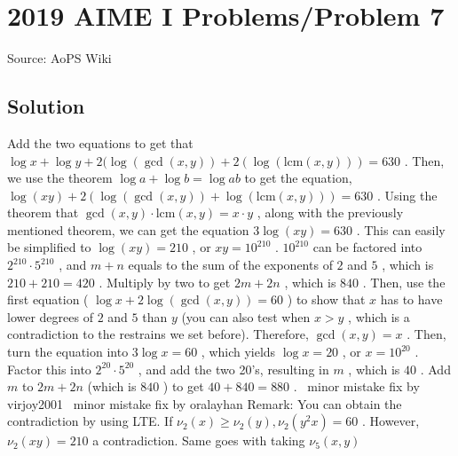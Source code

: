 \documentclass[12pt]{article}
\begin{document}
\section*{{2019 AIME I Problems/Problem 7}}
Source: AoPS Wiki

\subsection*{Solution}
Add the two equations to get that $\log x+\log y+2(\log(\gcd(x,y))+2(\log(\text{lcm}(x,y)))=630$ .
Then, we use the theorem $\log a+\log b=\log ab$ to get the equation, $\log (xy)+2(\log(\gcd(x,y))+\log(\text{lcm}(x,y)))=630$ .
Using the theorem that $\gcd(x,y) \cdot \text{lcm}(x,y)=x\cdot y$ , along with the previously mentioned theorem, we can get the equation $3\log(xy)=630$ .
This can easily be simplified to $\log(xy)=210$ , or $xy = 10^{210}$ . $10^{210}$ can be factored into $2^{210} \cdot 5^{210}$ , and $m+n$ equals to the sum of the exponents of $2$ and $5$ , which is $210+210 = 420$ .
Multiply by two to get $2m +2n$ , which is $840$ .
Then, use the first equation ( $\log x + 2\log(\gcd(x,y)) = 60$ ) to show that $x$ has to have lower degrees of $2$ and $5$ than $y$ (you can also test when $x>y$ , which is a contradiction to the restrains we set before). Therefore, $\gcd(x,y)=x$ . Then, turn the equation into $3\log x = 60$ , which yields $\log x = 20$ , or $x = 10^{20}$ .
Factor this into $2^{20} \cdot 5^{20}$ , and add the two 20's, resulting in $m$ , which is $40$ .
Add $m$ to $2m + 2n$ (which is $840$ ) to get $40+840 = \boxed{880}$ . ~minor mistake fix by virjoy2001
~minor mistake fix by oralayhan Remark: You can obtain the contradiction by using LTE. If $\nu_2{(x)}\geq{\nu_2{(y)}}, \nu_2{(y^2x)}=60$ . However, $\nu_2{(xy)}=210$ a contradiction. Same goes with taking $\nu_5{(x,y)}$
\end{document}
